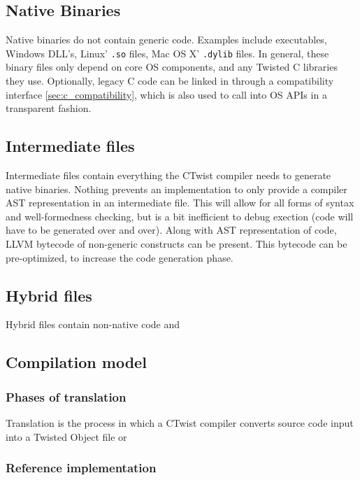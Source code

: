\documentclass[a4paper,11pt]{article}
\newcommand{\tcode}[1]{\texttt{#1}}
\begin{document}
  \subsection{Native Binaries}

Native binaries do not contain generic code.
Examples include executables, Windows DLL's, Linux' \tcode{.so} files, Mac OS X' \tcode{.dylib} files.
In general, these binary files only depend on core OS components, and any Twisted C libraries they use.
Optionally, legacy C code can be linked in through a compatibility interface \ref{sec:c_compatibility}, which is also used to call into OS APIs in a transparent fashion.

  \subsection{Intermediate files}

Intermediate files contain everything the CTwist compiler needs to generate native binaries.
Nothing prevents an implementation to only provide a compiler AST representation in an intermediate file.
This will allow for all forms of syntax and well-formedness checking, but is a bit inefficient to debug exection (code will have to be generated over and over).
Along with AST representation of code, LLVM bytecode of non-generic constructs can be present.
This bytecode can be pre-optimized, to increase the code generation phase. 

  \subsection{Hybrid files}

Hybrid files contain non-native code and 

  \subsection{Compilation model}
    \subsubsection{Phases of translation}

Translation is the process in which a CTwist compiler converts source code input into a Twisted Object file or 

    \subsubsection{Reference implementation}
\end{document}
